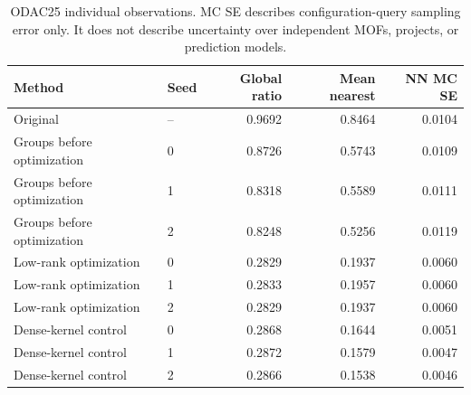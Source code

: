 \begin{table}[htbp]\centering\begin{tabular}{llrrr}
\toprule
Method & Seed & Global ratio & Mean nearest & NN MC SE\\\midrule
Original & -- & 0.9692 & 0.8464 & 0.0104\\
Groups before optimization & 0 & 0.8726 & 0.5743 & 0.0109\\
Groups before optimization & 1 & 0.8318 & 0.5589 & 0.0111\\
Groups before optimization & 2 & 0.8248 & 0.5256 & 0.0119\\
Low-rank optimization & 0 & 0.2829 & 0.1937 & 0.0060\\
Low-rank optimization & 1 & 0.2833 & 0.1957 & 0.0060\\
Low-rank optimization & 2 & 0.2829 & 0.1937 & 0.0060\\
Dense-kernel control & 0 & 0.2868 & 0.1644 & 0.0051\\
Dense-kernel control & 1 & 0.2872 & 0.1579 & 0.0047\\
Dense-kernel control & 2 & 0.2866 & 0.1538 & 0.0046\\
\bottomrule\end{tabular}
\caption{ODAC25 individual observations. MC SE describes configuration-query sampling error only. It does not describe uncertainty over independent MOFs, projects, or prediction models.}\end{table}
